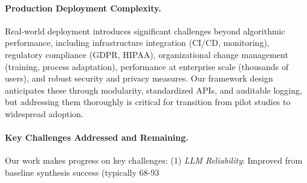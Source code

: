 \documentclass[manuscript,screen,review,anonymous,9pt]{acmart}
\begin{document}
\paragraph{Production Deployment Complexity.} Real-world deployment introduces significant challenges beyond algorithmic performance, including infrastructure integration (CI/CD, monitoring), regulatory compliance (GDPR, HIPAA), organizational change management (training, process adaptation), performance at enterprise scale (thousands of users), and robust security and privacy measures. Our framework design anticipates these through modularity, standardized APIs, and auditable logging, but addressing them thoroughly is critical for transition from pilot studies to widespread adoption.

\paragraph{Key Challenges Addressed and Remaining.}
Our work makes progress on key challenges: (1) \textit{LLM Reliability}: Improved from baseline synthesis success (typically 68-93%
\end{document}
